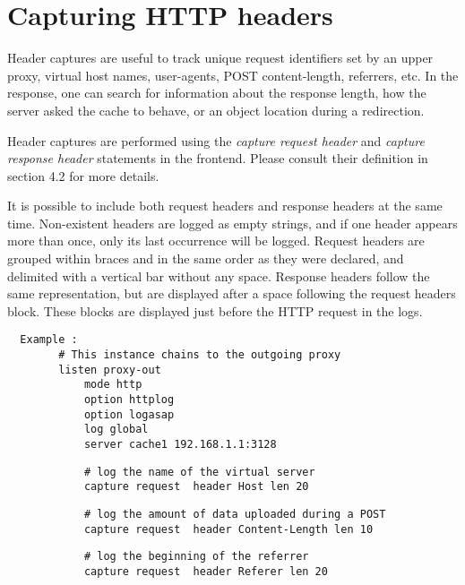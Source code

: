
\section{Capturing HTTP headers}

Header captures are useful to track unique request identifiers set by an upper
proxy, virtual host names, user-agents, POST content-length, referrers, etc. In
the response, one can search for information about the response length, how the
server asked the cache to behave, or an object location during a redirection.


Header captures are performed using the \emph{capture request header} and \emph{capture
response header} statements in the frontend. Please consult their definition in
section 4.2 for more details.


It is possible to include both request headers and response headers at the same
time. Non-existent headers are logged as empty strings, and if one header
appears more than once, only its last occurrence will be logged. Request headers
are grouped within braces \CHAR{\{} and \CHAR{\}} in the same order as they were declared,
and delimited with a vertical bar \CHAR{|} without any space. Response headers
follow the same representation, but are displayed after a space following the
request headers block. These blocks are displayed just before the HTTP request
in the logs.

\begin{verbatim}
  Example :
        # This instance chains to the outgoing proxy
        listen proxy-out
            mode http
            option httplog
            option logasap
            log global
            server cache1 192.168.1.1:3128
\end{verbatim}

\begin{verbatim}
            # log the name of the virtual server
            capture request  header Host len 20
\end{verbatim}

\begin{verbatim}
            # log the amount of data uploaded during a POST
            capture request  header Content-Length len 10
\end{verbatim}

\begin{verbatim}
            # log the beginning of the referrer
            capture request  header Referer len 20
\end{verbatim}

